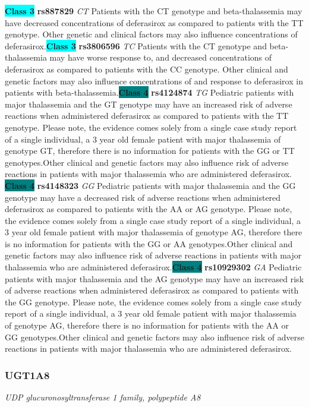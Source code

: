 \documentclass{report}
\begin{document}
\textbf{\colorbox{cyan} {Class 3}} \textbf{ rs887829 } \textit{ CT }
Patients with the CT genotype and beta-thalassemia may have decreased concentrations of deferasirox as compared to patients with the TT genotype. Other genetic and clinical factors may also influence concentrations of deferasirox.\newline\textbf{\colorbox{cyan} {Class 3}} \textbf{ rs3806596 } \textit{ TC }
Patients with the CT genotype and beta-thalassemia may have worse response to, and decreased concentrations of deferasirox as compared to patients with the CC genotype. Other clinical and genetic factors may also influence concentrations of and response to deferasirox in patients with beta-thalassemia.\newline\textbf{\colorbox{teal} {Class 4}} \textbf{ rs4124874 } \textit{ TG }
Pediatric patients with major thalassemia and the GT genotype may have an increased risk of adverse reactions when administered deferasirox as compared to patients with the TT genotype. Please note, the evidence comes solely from a single case study report of a single individual, a 3 year old female patient with major thalassemia of genotype GT, therefore there is no information for patients with the GG or TT genotypes.Other clinical and genetic factors may also influence risk of adverse reactions in patients with major thalassemia who are administered deferasirox. \newline\textbf{\colorbox{teal} {Class 4}} \textbf{ rs4148323 } \textit{ GG }
Pediatric patients with major thalassemia and the GG genotype may have a decreased risk of adverse reactions when administered deferasirox as compared to patients with the AA or AG genotype. Please note, the evidence comes solely from a single case study report of a single individual, a 3 year old female patient with major thalassemia of genotype AG, therefore there is no information for patients with the GG or AA genotypes.Other clinical and genetic factors may also influence risk of adverse reactions in patients with major thalassemia who are administered deferasirox.\newline\textbf{\colorbox{teal} {Class 4}} \textbf{ rs10929302 } \textit{ GA }
Pediatric patients with major thalassemia and the AG genotype may have an increased risk of adverse reactions when administered deferasirox as compared to patients with the GG genotype. Please note, the evidence comes solely from a single case study report of a single individual, a 3 year old female patient with major thalassemia of genotype AG, therefore there is no information for patients with the AA or GG genotypes.Other clinical and genetic factors may also influence risk of adverse reactions in patients with major thalassemia who are administered deferasirox.\newline\subsubsection{ UGT1A8 }
\textit{ UDP glucuronosyltransferase 1 family, polypeptide A8 }
\end{document}
